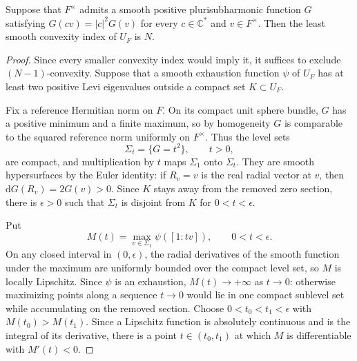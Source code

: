 \begin{proposition}\label{prop:homogeneous-psh-sharp-complement-index}
Suppose that $F^\times$ admits a smooth positive plurisubharmonic function $G$ satisfying $G(cv)=|c|^2G(v)$ for every $c\in\mathbb C^*$ and $v\in F^\times$. Then the least smooth convexity index of $U_F$ is $N$.
\end{proposition}
\begin{proof}
Since every smaller convexity index would imply it, it suffices to exclude $(N-1)$-convexity. Suppose that a smooth exhaustion function $\psi$ of $U_F$ has at least two positive Levi eigenvalues outside a compact set $K\subset U_F$.

Fix a reference Hermitian norm on $F$. On its compact unit sphere bundle, $G$ has a positive minimum and a finite maximum, so by homogeneity $G$ is comparable to the squared reference norm uniformly on $F^\times$. Thus the level sets
\[
 \Sigma_t=\{G=t^2\},\qquad t>0,
\]
are compact, and multiplication by $t$ maps $\Sigma_1$ onto $\Sigma_t$. They are smooth hypersurfaces by the Euler identity: if $R_v=v$ is the real radial vector at $v$, then $\mathrm dG(R_v)=2G(v)>0$. Since $K$ stays away from the removed zero section, there is $\epsilon>0$ such that $\Sigma_t$ is disjoint from $K$ for $0<t<\epsilon$.

Put
\[
 M(t)=\max_{v\in\Sigma_1}\psi([1:tv]),\qquad 0<t<\epsilon.
\]
On any closed interval in $(0,\epsilon)$, the radial derivatives of the smooth function under the maximum are uniformly bounded over the compact level set, so $M$ is locally Lipschitz. Since $\psi$ is an exhaustion, $M(t)\to+\infty$ as $t\to0$: otherwise maximizing points along a sequence $t\to0$ would lie in one compact sublevel set while accumulating on the removed section. Choose $0<t_0<t_1<\epsilon$ with $M(t_0)>M(t_1)$. Since a Lipschitz function is absolutely continuous and is the integral of its derivative, there is a point $t\in(t_0,t_1)$ at which $M$ is differentiable with $M'(t)<0$.


\end{proof}
